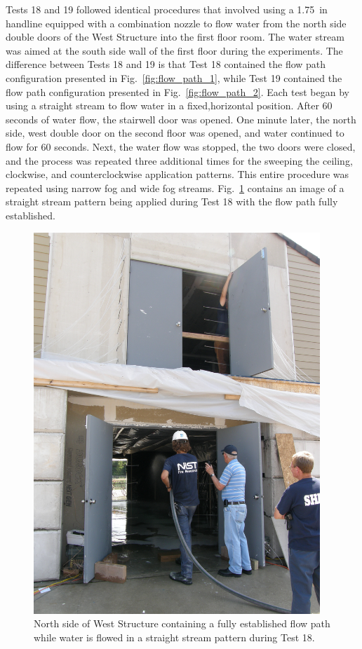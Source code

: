\documentclass[12pt,oneside]{book}
\begin{document}
Tests 18 and 19 followed identical procedures that involved using a 1.75~in handline equipped with a combination nozzle to flow water from the north side double doors of the West Structure into the first floor room. The water stream was aimed at the south side wall of the first floor during the experiments. The difference between Tests 18 and 19 is that Test 18 contained the flow path configuration presented in Fig.~\ref{fig:flow_path_1}, while Test 19 contained the flow path configuration presented in Fig.~\ref{fig:flow_path_2}. Each test began by using a straight stream to flow water in a fixed,horizontal position. After 60 seconds of water flow, the stairwell door was opened. One minute later, the north side, west double door on the second floor was opened, and water continued to flow for 60 seconds. Next, the water flow was stopped, the two doors were closed, and the process was repeated three additional times for the sweeping the ceiling, clockwise, and counterclockwise application patterns. This entire procedure was repeated using narrow fog and wide fog streams. Fig.~\ref{fig:test_18_pic} contains an image of a straight stream pattern being applied during Test 18 with the flow path fully established.

\begin{figure}[!ht]
	\includegraphics[width=4.25in]{../Figures/Pictures/Test_18}
	\caption[North side of West Structure containing a fully established flow path during Test 18.]{North side of West Structure containing a fully established flow path while water is flowed in a straight stream pattern during Test 18.}
	\label{fig:test_18_pic}
\end{figure}
\FloatBarrier
\end{document}
